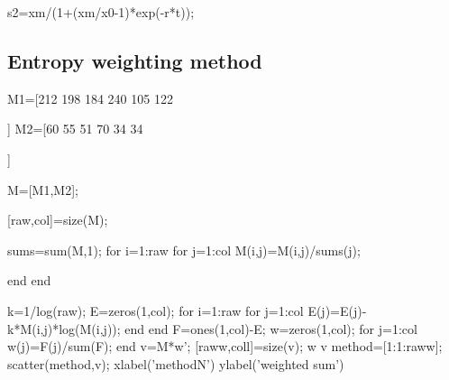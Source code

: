 \documentclass{mcmthesis}
\numberwithin{figure}{section}
\numberwithin{table}{section}
\numberwithin{equation}{section}
\begin{document}
\begin{appendices}
s2=xm/(1+(xm/x0-1)*exp(-r*t));


\subsection{Entropy weighting method}

M1=[212
198
184
240
105
122

]
M2=[60
55
51
70
34
34


]

M=[M1,M2];

[raw,col]=size(M);%

 sums=sum(M,1);
 for i=1:raw
     for j=1:col
         M(i,j)=M(i,j)/sums(j);
   
     end
 end

k=1/log(raw);
E=zeros(1,col);
for i=1:raw
    for j=1:col
     E(j)=E(j)-k*M(i,j)*log(M(i,j));
    end
end
F=ones(1,col)-E;
w=zeros(1,col);
for j=1:col
    w(j)=F(j)/sum(F);
end
v=M*w';
[raww,coll]=size(v);%
w
v
method=[1:1:raww];
scatter(method,v);
xlabel('methodN')
ylabel('weighted sum')



\end{appendices}
\end{document}
